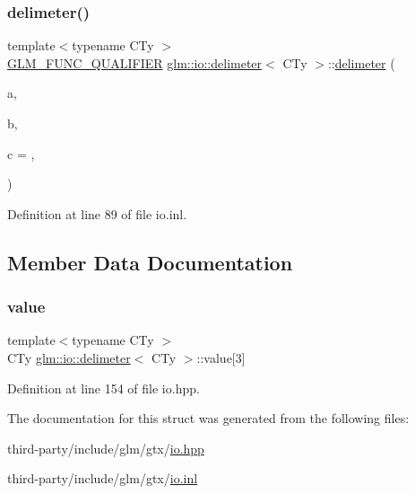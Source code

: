 \subsubsection{\texorpdfstring{delimeter()}{delimeter()}}
{\footnotesize\ttfamily template$<$typename C\+Ty $>$ \\
\hyperlink{setup_8hpp_a33fdea6f91c5f834105f7415e2a64407}{G\+L\+M\+\_\+\+F\+U\+N\+C\+\_\+\+Q\+U\+A\+L\+I\+F\+I\+ER} \hyperlink{structglm_1_1io_1_1delimeter}{glm\+::io\+::delimeter}$<$ C\+Ty $>$\+::\hyperlink{structglm_1_1io_1_1delimeter}{delimeter} (\begin{DoxyParamCaption}\item[{C\+Ty}]{a,  }\item[{C\+Ty}]{b,  }\item[{C\+Ty}]{c = {\ttfamily \textquotesingle{},\textquotesingle{}} }\end{DoxyParamCaption})\hspace{0.3cm}{\ttfamily [explicit]}}



Definition at line 89 of file io.\+inl.



\subsection{Member Data Documentation}
\mbox{\label{structglm_1_1io_1_1delimeter_a9ade129dae50c4f716f724e7425f9c68}} 
\subsubsection{\texorpdfstring{value}{value}}
{\footnotesize\ttfamily template$<$typename C\+Ty $>$ \\
C\+Ty \hyperlink{structglm_1_1io_1_1delimeter}{glm\+::io\+::delimeter}$<$ C\+Ty $>$\+::value\mbox{[}3\mbox{]}}



Definition at line 154 of file io.\+hpp.



The documentation for this struct was generated from the following files\+:\begin{DoxyCompactItemize}
\item 
third-\/party/include/glm/gtx/\hyperlink{io_8hpp}{io.\+hpp}\item 
third-\/party/include/glm/gtx/\hyperlink{io_8inl}{io.\+inl}\end{DoxyCompactItemize}
